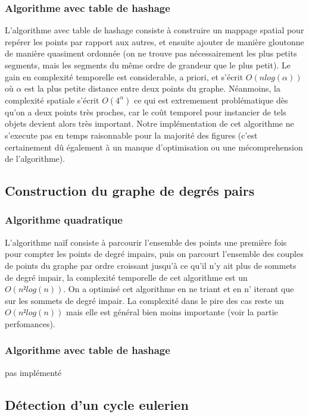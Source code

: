 \documentclass[a4paper,11pt]{article}
\begin{document}
\subsubsection{Algorithme avec table de hashage}

L'algorithme avec table de hashage consiste à construire un mappage spatial pour repérer les points par rapport
aux autres, et ensuite ajouter de manière gloutonne de manière quasiment ordonnée (on ne trouve pas nécessairement
les plus petits segments, mais les segments du même ordre de grandeur que le plus petit). Le gain en complexité temporelle
est considerable, a priori, et s'écrit $O(nlog(\alpha))$ où $\alpha$ est la plus petite distance entre deux points du graphe.
Néanmoins, la complexité spatiale s'écrit $O(4^{\alpha})$ ce qui est extremement problématique dès qu'on a deux points très proches,
car le coût temporel pour instancier de tels objets devient alors très important.
Notre implémentation de cet algorithme ne s'execute pas en temps raisonnable pour la majorité des figures (c'est certainement dû
également à un manque d'optimisation ou une mécomprehension de l'algorithme).
\subsection{Construction du graphe de degrés pairs}

\subsubsection{Algorithme quadratique}

L'algorithme naïf consiste à parcourir l'ensemble des points une première fois pour compter les points de degré impairs,
puis on parcourt l'ensemble des couples de points du graphe par ordre croissant jusqu'à ce qu'il n'y ait plus de sommets de
degré impair, la complexité temporelle de cet algorithme est un $O(n²log(n))$. On a optimisé cet algorithme en ne triant et en n'
iterant que sur les sommets de degré impair. La complexité dans le pire des cas reste un $O(n²log(n))$ mais elle est général bien
moins importante (voir la partie perfomances).

\subsubsection{Algorithme avec table de hashage}

pas implémenté

\subsection{Détection d'un cycle eulerien}
\end{document}
